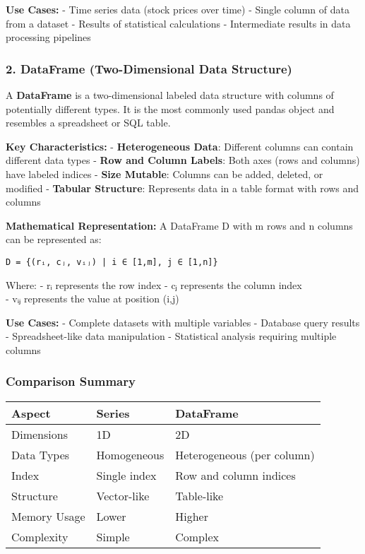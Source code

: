 \documentclass[11pt]{article}
\begin{document}
\textbf{Use Cases:} - Time series data (stock prices over time) - Single
column of data from a dataset - Results of statistical calculations -
Intermediate results in data processing pipelines

\subsubsection{2. DataFrame (Two-Dimensional Data
Structure)}\label{dataframe-two-dimensional-data-structure}

A \textbf{DataFrame} is a two-dimensional labeled data structure with
columns of potentially different types. It is the most commonly used
pandas object and resembles a spreadsheet or SQL table.

\textbf{Key Characteristics:} - \textbf{Heterogeneous Data}: Different
columns can contain different data types - \textbf{Row and Column
Labels}: Both axes (rows and columns) have labeled indices -
\textbf{Size Mutable}: Columns can be added, deleted, or modified -
\textbf{Tabular Structure}: Represents data in a table format with rows
and columns

\textbf{Mathematical Representation:} A DataFrame D with m rows and n
columns can be represented as:

\begin{verbatim}
D = {(rᵢ, cⱼ, vᵢⱼ) | i ∈ [1,m], j ∈ [1,n]}
\end{verbatim}

Where: - rᵢ represents the row index - cⱼ represents the column index\\
- vᵢⱼ represents the value at position (i,j)

\textbf{Use Cases:} - Complete datasets with multiple variables -
Database query results - Spreadsheet-like data manipulation -
Statistical analysis requiring multiple columns

\subsubsection{Comparison Summary}\label{comparison-summary}

\begin{longtable}[]{@{}lll@{}}
\toprule\noalign{}
Aspect & Series & DataFrame \\
\midrule\noalign{}
\endhead
\bottomrule\noalign{}
\endlastfoot
Dimensions & 1D & 2D \\
Data Types & Homogeneous & Heterogeneous (per column) \\
Index & Single index & Row and column indices \\
Structure & Vector-like & Table-like \\
Memory Usage & Lower & Higher \\
Complexity & Simple & Complex \\
\end{longtable}
\end{document}
